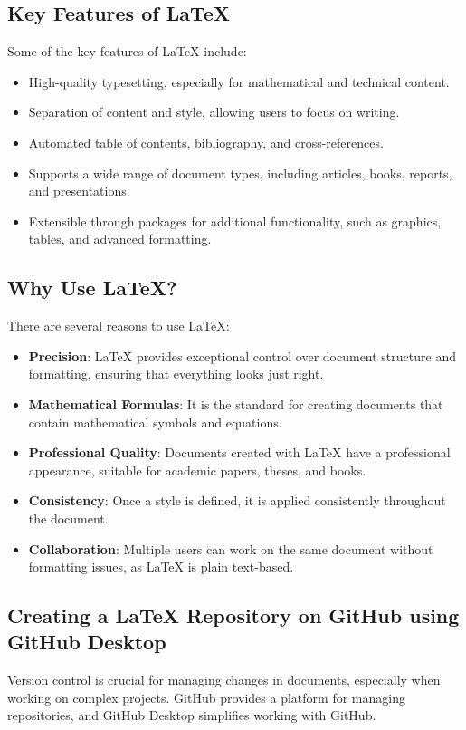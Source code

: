 \documentclass{article}
\begin{document}
\subsection {Key Features of \LaTeX}
Some of the key features of \LaTeX{} include:
\begin{itemize}
    \item High-quality typesetting, especially for mathematical and technical content.
    \item Separation of content and style, allowing users to focus on writing.
    \item Automated table of contents, bibliography, and cross-references.
    \item Supports a wide range of document types, including articles, books, reports, and presentations.
    \item Extensible through packages for additional functionality, such as graphics, tables, and advanced formatting.
\end{itemize}
\subsection{Why Use \LaTeX?}
There are several reasons to use \LaTeX{}:
\begin{itemize}
    \item \textbf{Precision}: \LaTeX{} provides exceptional control over document structure and formatting, ensuring that everything looks just right.
    \item \textbf{Mathematical Formulas}: It is the standard for creating documents that contain mathematical symbols and equations.
    \item \textbf{Professional Quality}: Documents created with \LaTeX{} have a professional appearance, suitable for academic papers, theses, and books.
    \item \textbf{Consistency}: Once a style is defined, it is applied consistently throughout the document.
    \item \textbf{Collaboration}: Multiple users can work on the same document without formatting issues, as \LaTeX{} is plain text-based.
\end{itemize}
\subsection{Creating a \LaTeX{} Repository on GitHub using GitHub Desktop}
Version control is crucial for managing changes in documents, especially when working on complex projects. GitHub provides a platform for managing repositories, and GitHub Desktop simplifies working with GitHub.
\end{document}
